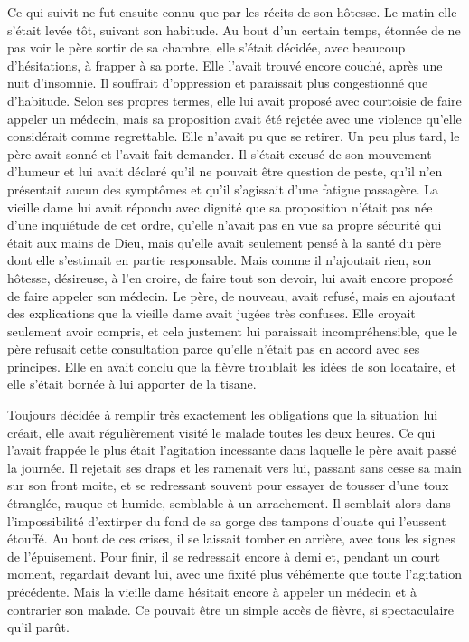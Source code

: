 \documentclass[french,twoside]{book} %
\begin{document}
Ce qui suivit ne fut ensuite connu que par les récits de son hôtesse. Le matin elle s’était levée tôt, suivant son habitude. Au bout d’un certain temps, étonnée de ne pas voir le père sortir de sa chambre, elle s’était décidée, avec beaucoup d’hésitations, à frapper à sa porte. Elle l’avait trouvé encore couché, après une nuit d’insomnie. Il souffrait d’oppression et paraissait plus congestionné que d’habitude. Selon ses propres termes, elle lui avait proposé avec courtoisie de faire appeler un médecin, mais sa proposition avait été rejetée avec une violence qu’elle considérait comme regrettable. Elle n’avait pu que se retirer. Un peu plus tard, le père avait sonné et l’avait fait demander. Il s’était excusé de son mouvement d’humeur et lui avait déclaré qu’il ne pouvait être question de peste, qu’il n’en présentait aucun des symptômes et qu’il s’agissait d’une fatigue passagère. La vieille dame lui avait répondu avec dignité que sa proposition n’était pas née d’une inquiétude de cet ordre, qu’elle n’avait pas en vue sa propre sécurité qui était aux mains de Dieu, mais qu’elle avait seulement pensé à la santé du père dont elle s’estimait en partie responsable. Mais comme il n’ajoutait rien, son hôtesse, désireuse, à l’en croire, de faire tout son devoir, lui avait encore proposé de faire appeler son médecin. Le père, de nouveau, avait refusé, mais en ajoutant des explications que la vieille dame avait jugées très confuses. Elle croyait seulement avoir compris, et cela justement lui paraissait incompréhensible, que le père refusait cette consultation parce qu’elle n’était pas en accord avec ses principes. Elle en avait conclu que la fièvre troublait les idées de son locataire, et elle s’était bornée à lui apporter de la tisane.\par
Toujours décidée à remplir très exactement les obligations que la situation lui créait, elle avait régulièrement visité le malade toutes les deux heures. Ce qui l’avait frappée le plus était l’agitation incessante dans laquelle le père avait passé la journée. Il rejetait ses draps et les ramenait vers lui, passant sans cesse sa main sur son front moite, et se redressant souvent pour essayer de tousser d’une toux étranglée, rauque et humide, semblable à un arrachement. Il semblait alors dans l’impossibilité d’extirper du fond de sa gorge des tampons d’ouate qui l’eussent étouffé. Au bout de ces crises, il se laissait tomber en arrière, avec tous les signes de l’épuisement. Pour finir, il se redressait encore à demi et, pendant un court moment, regardait devant lui, avec une fixité plus véhémente que toute l’agitation précédente. Mais la vieille dame hésitait encore à appeler un médecin et à contrarier son malade. Ce pouvait être un simple accès de fièvre, si spectaculaire qu’il parût.\par
\end{document}
